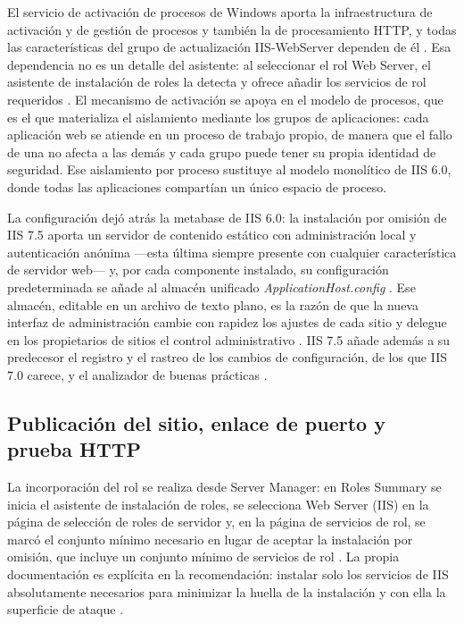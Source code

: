 \documentclass[12pt]{article}
\begin{document}
El servicio de activación de procesos de Windows aporta la infraestructura de activación y de gestión de procesos y también la de procesamiento HTTP, y todas las características del grupo de actualización IIS-WebServer dependen de él \parencite{microsoftUnderstandingIisSetup}. Esa dependencia no es un detalle del asistente: al seleccionar el rol Web Server, el asistente de instalación de roles la detecta y ofrece añadir los servicios de rol requeridos \parencite{microsoftInstallIis7}. El mecanismo de activación se apoya en el modelo de procesos, que es el que materializa el aislamiento mediante los grupos de aplicaciones: cada aplicación web se atiende en un proceso de trabajo propio, de manera que el fallo de una no afecta a las demás y cada grupo puede tener su propia identidad de seguridad. Ese aislamiento por proceso sustituye al modelo monolítico de IIS 6.0, donde todas las aplicaciones compartían un único espacio de proceso.

La configuración dejó atrás la metabase de IIS 6.0: la instalación por omisión de IIS 7.5 aporta un servidor de contenido estático con administración local y autenticación anónima ---esta última siempre presente con cualquier característica de servidor web--- y, por cada componente instalado, su configuración predeterminada se añade al almacén unificado \textit{ApplicationHost.config} \parencite{microsoftUnderstandingIisSetup}. Ese almacén, editable en un archivo de texto plano, es la razón de que la nueva interfaz de administración cambie con rapidez los ajustes de cada sitio y delegue en los propietarios de sitios el control administrativo \parencite{microsoftInstallIis7}. IIS 7.5 añade además a su predecesor el registro y el rastreo de los cambios de configuración, de los que IIS 7.0 carece, y el analizador de buenas prácticas \parencite{microsoftInstallIis7}.

\subsection{Publicación del sitio, enlace de puerto y prueba HTTP}
\label{sec:publicacionSitio}

La incorporación del rol se realiza desde Server Manager: en Roles Summary se inicia el asistente de instalación de roles, se selecciona Web Server (IIS) en la página de selección de roles de servidor y, en la página de servicios de rol, se marcó el conjunto mínimo necesario en lugar de aceptar la instalación por omisión, que incluye un conjunto mínimo de servicios de rol \parencite{microsoftInstallIis7}. La propia documentación es explícita en la recomendación: instalar solo los servicios de IIS absolutamente necesarios para minimizar la huella de la instalación y con ella la superficie de ataque \parencite{microsoftInstallIis7}.
\end{document}
